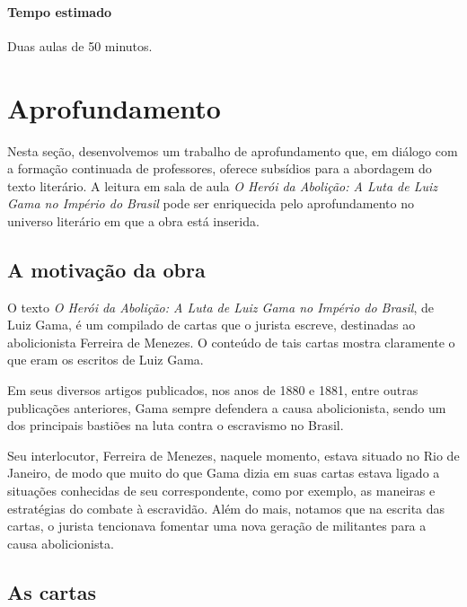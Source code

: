 \documentclass[12pt]{extarticle}
\begin{document}
\paragraph{Tempo estimado} Duas aulas de 50 minutos.

\section{Aprofundamento}

Nesta seção, desenvolvemos um trabalho de aprofundamento que, em diálogo
com a formação continuada de professores, oferece subsídios para a
abordagem do texto literário. A leitura em sala de aula \emph{O Herói da
Abolição: A Luta de Luiz Gama no Império do Brasil} pode ser enriquecida
pelo aprofundamento no universo literário em que a obra está inserida.

\subsection{A motivação da obra}

O texto \emph{O Herói da Abolição: A Luta de Luiz Gama no Império do
Brasil}, de Luiz Gama, é um compilado de cartas que o jurista escreve,
destinadas ao abolicionista Ferreira de Menezes. O conteúdo de tais
cartas mostra claramente o que eram os escritos de Luiz Gama.

Em seus diversos artigos publicados, nos anos de 1880 e 1881, entre
outras publicações anteriores, Gama sempre defendera a causa
abolicionista, sendo um dos principais bastiões na luta contra o
escravismo no Brasil.

Seu interlocutor, Ferreira de Menezes, naquele momento, estava situado
no Rio de Janeiro, de modo que muito do que Gama dizia em suas cartas
estava ligado a situações conhecidas de seu correspondente, como por
exemplo, as maneiras e estratégias do combate à escravidão. Além do
mais, notamos que na escrita das cartas, o jurista tencionava fomentar
uma nova geração de militantes para a causa abolicionista.



\subsection{As cartas}
\end{document}

